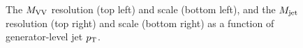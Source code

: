 \begin{figure}[h!]
\caption{The $M_{\rm VV}$ resolution (top left) and scale (bottom left), and the $M_{\rm jet}$ resolution (top right) and scale (bottom right) as a function of generator-level jet $p_{\mathrm{T}}$.}
\label{fig:ScaleResolution}
\end{figure}
